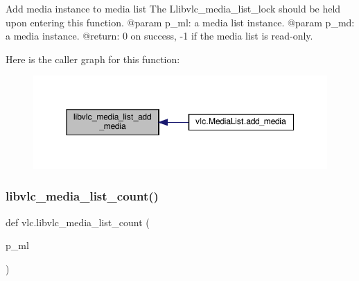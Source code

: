 \begin{DoxyVerb}Add media instance to media list
The L{libvlc_media_list_lock} should be held upon entering this function.
@param p_ml: a media list instance.
@param p_md: a media instance.
@return: 0 on success, -1 if the media list is read-only.
\end{DoxyVerb}
 Here is the caller graph for this function\+:
\nopagebreak
\begin{figure}[H]
\begin{center}
\leavevmode
\includegraphics[width=350pt]{namespacevlc_a98a21d94dfa80441792c173767f7df39_icgraph}
\end{center}
\end{figure}
\mbox{\label{namespacevlc_ac1e38d46f64d31d883c7404de7d2fa19}} 
\subsubsection{\texorpdfstring{libvlc\+\_\+media\+\_\+list\+\_\+count()}{libvlc\_media\_list\_count()}}
{\footnotesize\ttfamily def vlc.\+libvlc\+\_\+media\+\_\+list\+\_\+count (\begin{DoxyParamCaption}\item[{}]{p\+\_\+ml }\end{DoxyParamCaption})}

